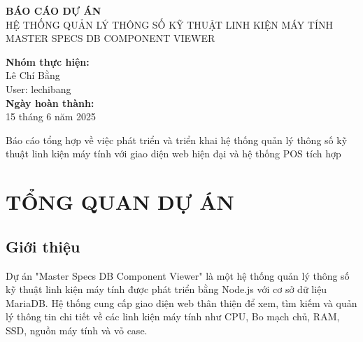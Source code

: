 \documentclass[12pt,a4paper]{article}
\begin{document}
\begin{titlepage}
    \centering
    \vspace*{2cm}
    
    {\Huge\bfseries BÁO CÁO DỰ ÁN}\\[0.5cm]
    {\Large HỆ THỐNG QUẢN LÝ THÔNG SỐ KỸ THUẬT LINH KIỆN MÁY TÍNH}\\[0.3cm]
    {\Large MASTER SPECS DB COMPONENT VIEWER}\\[2cm]
    
    
    \vspace{2cm}
    
    {\Large\textbf{Nhóm thực hiện:}}\\[0.5cm]
    {\large Lê Chí Bằng}\\[0.3cm]
    {\large User: lechibang}\\[2cm]
    
    {\Large\textbf{Ngày hoàn thành:}}\\[0.5cm]
    {\large 15 tháng 6 năm 2025}\\[2cm]
    
    \vfill
    
    {\large Báo cáo tổng hợp về việc phát triển và triển khai hệ thống quản lý thông số kỹ thuật linh kiện máy tính với giao diện web hiện đại và hệ thống POS tích hợp}
    
\end{titlepage}

\tableofcontents
\newpage

\section{TỔNG QUAN DỰ ÁN}

\subsection{Giới thiệu}
Dự án "Master Specs DB Component Viewer" là một hệ thống quản lý thông số kỹ thuật linh kiện máy tính được phát triển bằng Node.js với cơ sở dữ liệu MariaDB. Hệ thống cung cấp giao diện web thân thiện để xem, tìm kiếm và quản lý thông tin chi tiết về các linh kiện máy tính như CPU, Bo mạch chủ, RAM, SSD, nguồn máy tính và vỏ case.
\end{document}
